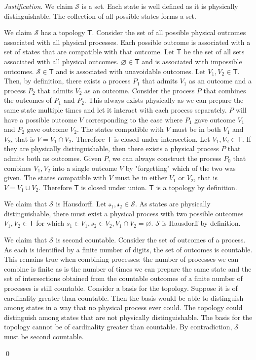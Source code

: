 \documentclass[aps,pra,10pt,twocolumn,floatfix,nofootinbib]{revtex4-1}
\numberwithin{equation}{section}
\theoremstyle{definition}
\newenvironment{justification}{\emph{Justification}.}{\qed}
\begin{document}
\begin{justification}
We claim $\mathcal{S}$ is a set. Each state is well defined as it is physically distinguishable. The collection of all possible states forms a set.

We claim $\mathcal{S}$ has a topology $\mathsf{T}$. Consider the set of all possible physical outcomes associated with all physical processes. Each possible outcome is associated with a set of states that are compatible with that outcome. Let $\mathsf{T}$ be the set of all sets associated with all physical outcomes. $\varnothing \in \mathsf{T}$ and is associated with impossible outcomes. $\mathcal{S} \in \mathsf{T}$ and is associated with unavoidable outcomes. Let $V_1, V_2 \in \mathsf{T}$. Then, by definition, there exists a process $P_1$ that admits $V_1$ as an outcome and a process $P_2$ that admits $V_2$ as an outcome. Consider the process $P$ that combines the outcomes of $P_1$ and $P_2$. This always exists physically as we can prepare the same state multiple times and let it interact with each process separately. $P$ will have a possible outcome $V$ corresponding to the case where $P_1$ gave outcome $V_1$ and $P_2$ gave outcome $V_2$. The states compatible with $V$ must be in both $V_1$ and $V_2$, that is $V = V_1 \cap V_2$. Therefore $\mathsf{T}$ is closed under intersection. Let $V_1, V_2 \in \mathsf{T}$. If they are physically distinguishable, then there exists a physical process $P$ that admits both as outcomes. Given $P$, we can always construct the process $P_0$ that combines $V_1, V_2$ into a single outcome $V$ by "forgetting" which of the two was given. The states compatible with $V$ must be in either $V_1$ or $V_2$, that is $V = V_1 \cup V_2$. Therefore $\mathsf{T}$ is closed under union. $\mathsf{T}$ is a topology by definition.

We claim that $\mathcal{S}$ is Hausdorff. Let $\mathcal{s_1}, \mathcal{s_2} \in \mathcal{S}$. As states are physically distinguishable, there must exist a physical process with two possible outcomes $V_1, V_2 \in \mathsf{T}$ for which $s_1 \in V_1, s_2 \in V_2, V_1 \cap V_2 = \varnothing$. $\mathcal{S}$ is Hausdorff by definition.

We claim that $\mathcal{S}$ is second countable. Consider the set of outcomes of a process. As each is identified by a finite number of digits, the set of outcomes is countable. This remains true when combining processes: the number of processes we can combine is finite as is the number of times we can prepare the same state and the set of intersections obtained from the countable outcomes of a finite number of processes is still countable. Consider a basis for the topology. Suppose it is of cardinality greater than countable. Then the basis would be able to distinguish among states in a way that no physical process ever could. The topology could distinguish among states that are not physically distinguishable. The basis for the topology cannot be of cardinality greater than countable. By contradiction, $\mathcal{S}$ must be second countable.

\end{justification}
\end{document}
